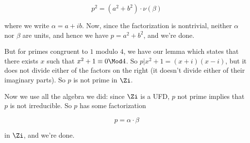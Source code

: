 \documentclass{scrbook}
\begin{document}
$$p^2 = (a^2+b^2)\cdot\nu(\beta)$$

where we write $\alpha = a+ib$. Now, since the factorization is nontrivial,
neither $\alpha$ nor $\beta$ are units, and hence we have $p=a^2+b^2$, and we're done.

But for primes congruent to $1$ modulo $4$, we have our lemma which
states that there exists $x$ such that $x^2+1\equiv 0\Mod 4$. So
$p|x^2+1 = (x+i)(x-i)$, but it does not divide either of the factors on the
right (it doesn't divide either of their imaginary parts).
So $p$ is not prime in $\Zi$.

Now we use all the algebra we did: since $\Zi$ is a UFD, $p$ not prime
implies that $p$ is not irreducible. So $p$ has some factorization

$$p=\alpha\cdot\beta$$

in $\Zi$, and we're done.
\end{document}
